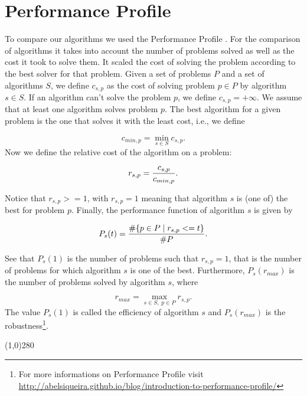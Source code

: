 \section{Performance Profile}
To compare our algorithms we used the Performance Profile \cite{dolan2002benchmarking}. For the comparison of algorithms it takes into account the number of problems solved as well as the cost it took to solve them. It scaled the cost of solving the problem according to the best solver for that problem. Given a set of problems $P$ and a set of algorithms $S$, we define $c_{s,p}$ as the cost of solving problem $p \in P$ by algorithm $s\in S$. If an algorithm can't solve the problem $p$, we define $c_{s,p} = +\infty$. We assume that at least one algorithm solves problem $p$. The best algorithm for a given problem is the one that solves it with the least cost, i.e., we define

\begin{equation}
	c_{min,p} = \min_{s \in S} c_{s,p}.
\end{equation}
\noindent 
Now we define the relative cost of the algorithm on a problem:

\begin{equation}
	r_{s,p} = {c_{s,p} \over c_{min,p}}.
\end{equation}

\noindent 
Notice that $r_{s,p} >= 1$, with $r_{s,p}=1$ meaning that algorithm $s$ is (one of) the best for problem $p$. Finally, the performance function of algorithm $s$ is given by

\begin{equation}
	P_s(t) = {\#\{p \in P \;|\; r_{s,p} <= t \} \over \#P}.
\end{equation}

\noindent 
See that $P_s(1)$ is the number of problems such that $r_{s,p} = 1$, that is the number of problems for which algorithm $s$ is one of the best. Furthermore, $P_s(r_{max})$ is the number of problems solved by algorithm $s$, where

\begin{equation}
	r_{max} = \max_{s \in S,\; p \in P} r_{s,p}.
\end{equation}
\noindent
The value $P_s(1)$ is called the efficiency of algorithm $s$ and $P_s(r_{max})$ is the robustness\footnote{For more informations on Performance Profile visit \url{http://abelsiqueira.github.io/blog/introduction-to-performance-profile/}}.

\begin{center}
\line(1,0){280}
\end{center}

